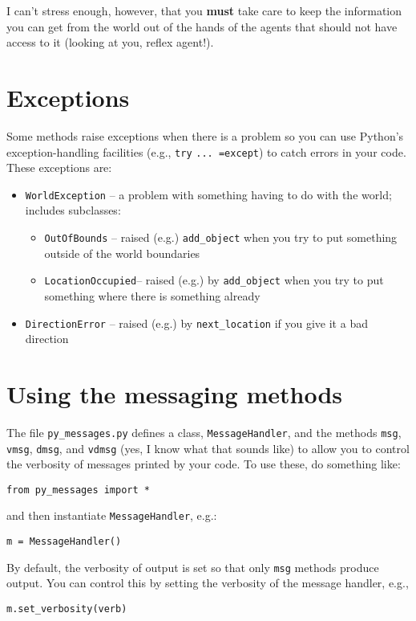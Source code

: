 \documentclass[11pt]{tufte-handout}
\begin{document}
I can't stress enough, however, that you \textbf{must} take care to keep the information you can get from the world out of the hands of the agents that should not have access to it (looking at you, reflex agent!).

\section{Exceptions}
\label{sec:org9a5d913}

Some methods raise exceptions when there is a problem so you can use Python's exception-handling facilities (e.g., \texttt{try} \texttt{... =except}) to catch errors in your code.  These exceptions are:
\begin{itemize}
\item \texttt{WorldException} -- a problem with something having to do with the world; includes subclasses:
\begin{itemize}
\item \texttt{OutOfBounds} -- raised (e.g.) \texttt{add\_object} when you try to put something outside of the world boundaries
\item \texttt{LocationOccupied}-- raised (e.g.) by \texttt{add\_object} when you try to put something where there is something already
\end{itemize}
\item \texttt{DirectionError} -- raised (e.g.) by \texttt{next\_location} if you give it a bad direction
\end{itemize}

\section{Using the messaging methods}
\label{sec:orgc946770}

The file \texttt{py\_messages.py} defines a class, \texttt{MessageHandler}, and the methods \texttt{msg}, \texttt{vmsg}, \texttt{dmsg}, and \texttt{vdmsg} (yes, I know what that sounds like) to allow you to control the verbosity of messages printed by your code.  To use these, do something like:
\begin{verbatim}
from py_messages import *
\end{verbatim}

and then  instantiate \texttt{MessageHandler}, e.g.:
\begin{verbatim}
m = MessageHandler()
\end{verbatim}


By default, the verbosity of output is set so that only \texttt{msg} methods produce output.  You can control this by setting the verbosity of the message handler, e.g.,
\begin{verbatim}
m.set_verbosity(verb)
\end{verbatim}
\end{document}
